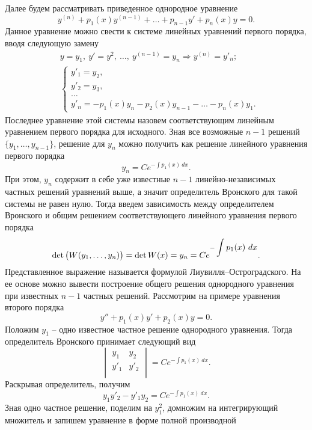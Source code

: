     Далее будем рассматривать приведенное однородное уравнение
    \[
        y^{(n)} + p_1(x) y^{(n - 1)} + \dots + p_{n - 1} y' + p_n(x) y = 0.
    \]
    Данное уравнение можно свести к системе линейных уравнений первого порядка, вводя следующую замену
    \[
        \begin{split}
            &y = y_1, ~ y' = y^2, ~ \dots, ~ y^{(n - 1)} = y_n \Longrightarrow y^{(n)} = y'_n; \\
            &\begin{cases}
                y'_1 = y_2, \\
                y'_2 = y_3, \\
                \dots \\
                y'_n = -p_1(x) y_n - p_2(x) y_{n - 1} - \dots - p_n(x) y_1.
            \end{cases}
        \end{split}
    \]
    Последнее уравнение этой системы назовем соответствующим линейным уравнением первого порядка для исходного. Зная все возможные $ n - 1 $ решений $ \{ y_1, \dots, y_{n - 1} \} $, решение для $ y_n $ можно получить как решение линейного уравнения первого порядка
    \[
        y_n = Ce^{-\displaystyle\int p_1(x) ~ dx}.
    \]
    При этом, $ y_n $ содержит в себе уже известные $ n - 1 $ линейно-независимых частных решений уравнений выше, а значит определитель Вронского для такой системы не равен нулю. Тогда введем зависимость между определителем Вронского и общим решением соответствующего линейного уравнения первого порядка
    \[
        \det{ \bigl( W(y_1, \dots, y_n) \bigr) } = \det{W(x)} = y_n = Ce^{-\displaystyle\int p_1(x) ~ dx}.
    \]
    Представленное выражение называется формулой Лиувилля--Остроградского. На ее основе можно вывести построение общего решения однородного уравнения при известных $ n - 1 $ частных решений. Рассмотрим на примере уравнения второго порядка
    \[
        y'' + p_1(x) y' + p_2(x) y = 0.
    \]
    Положим $ y_1 $ -- одно известное частное решение однородного уравнения. Тогда определитель Вронского принимает следующий вид
    \[
        \begin{vmatrix}
            y_1 & y_2 \\
            y'_1 & y'_2 \\
        \end{vmatrix}
        = Ce^{-\displaystyle\int p_1(x) ~ dx}.
    \]
    Раскрывая определитель, получим
    \[
        y_1 y'_2 - y'_1 y_2 = Ce^{-\displaystyle\int p_1(x) ~ dx}.
    \]
    Зная одно частное решение, поделим на $ y^2_1 $, домножим на интегрирующий множитель и запишем уравнение в форме полной производной
